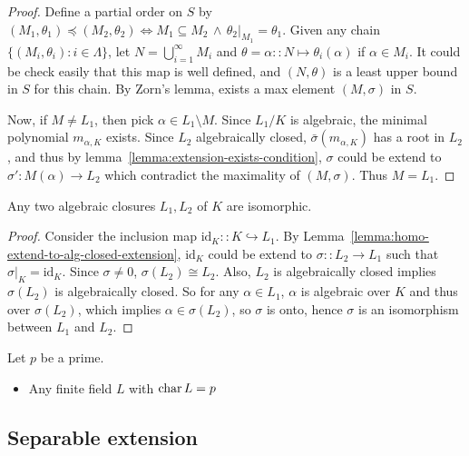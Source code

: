 \begin{theorem}
\begin{lemma}
\begin{proof}
      Define a partial order on $S$ by $(M_1, \theta_1) \preceq (M_2, \theta_2)
      \iff M_1 \subseteq M_2 \,\land\, \theta_2 \big|_{M_1} = \theta_1$.
      Given any chain $\{(M_i, \theta_i) : i \in \Lambda \}$, let $N = \bigcup_{i = 1}^\infty M_i$ and
      $\theta = \alpha :: N \mapsto \theta_i(\alpha)$ if $\alpha \in M_i$. It could
      be check easily that this map is well defined, and $(N, \theta)$ is
      a least upper bound in $S$ for this chain.  By Zorn's lemma, exists a max element $(M, \sigma)$ in $S$.

      Now, if $M \neq L_1$, then pick $\alpha \in L_1 \setminus M$. Since $L_1/K$ is algebraic,
      the minimal polynomial $m_{\alpha, K}$ exists. Since $L_2$ algebraically closed, $\bar\sigma(m_{\alpha, K})$
      has a root in $L_2$, and thus by lemma~\ref{lemma:extension-exists-condition},
      $\sigma$ could be extend to $\sigma': M(\alpha) \to L_2$ which contradict the maximality of $(M, \sigma)$.
      Thus $M = L_1$.
    \end{proof}
  \end{lemma}

  \begin{theorem}
    Any two algebraic closures $L_1, L_2$ of $K$ are isomorphic.
    \begin{proof}
      Consider the inclusion map $\text{id}_K :: K \hookrightarrow L_1$.
      By Lemma~\ref{lemma:homo-extend-to-alg-closed-extension},
      $\text{id}_K$ could be extend to $\sigma :: L_2 \to L_1$ such that $\sigma\big|_K = \text{id}_K$.
      Since $\sigma \neq 0$, $\sigma(L_2) \cong L_2$.
      Also, $L_2$ is algebraically closed implies $\sigma(L_2)$ is algebraically closed.
      So for any $\alpha \in L_1$, $\alpha$ is algebraic over $K$ and thus over $\sigma(L_2)$,
      which implies $\alpha \in \sigma(L_2)$, so $\sigma$ is onto, hence $\sigma$ is an
      isomorphism between $L_1$ and $L_2$.
    \end{proof}
  \end{theorem}

  \begin{example}
    Let $p$ be a prime.
    \begin{itemize}
      \item Any finite field $L$ with $\operatorname{char} L = p$
    \end{itemize}
  \end{example}
\end{theorem}

\subsection{Separable extension}


